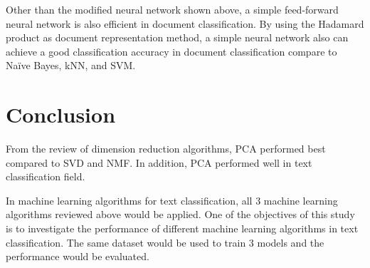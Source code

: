 Other than the modified neural network shown above, a simple feed-forward neural network is also efficient in document classification. By using the Hadamard product as document representation method, a simple neural network also can achieve a good classification accuracy in document classification compare to Naïve Bayes, kNN, and SVM. \cite{oneNn}
	
\section{Conclusion}
From the review of dimension reduction algorithms, PCA performed best compared to SVD and NMF. In addition, PCA performed well in text classification field. 
	
In machine learning algorithms for text classification, all 3 machine learning algorithms reviewed above would be applied. One of the objectives of this study is to investigate the performance of different machine learning algorithms in text classification. The same dataset would be used to train 3 models and the performance would be evaluated.
